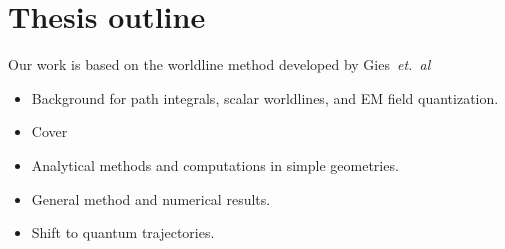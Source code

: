 \section{Thesis outline}

Our work is based on the worldline method developed by Gies~\textit{et.~al}\cite{Gies2003}
\begin{itemize}
\item Background for path integrals, scalar worldlines, and EM field quantization.
\item Cover 
\item Analytical methods and computations in simple geometries.
\item General method and numerical results.
\item Shift to quantum trajectories.  
\end{itemize}




